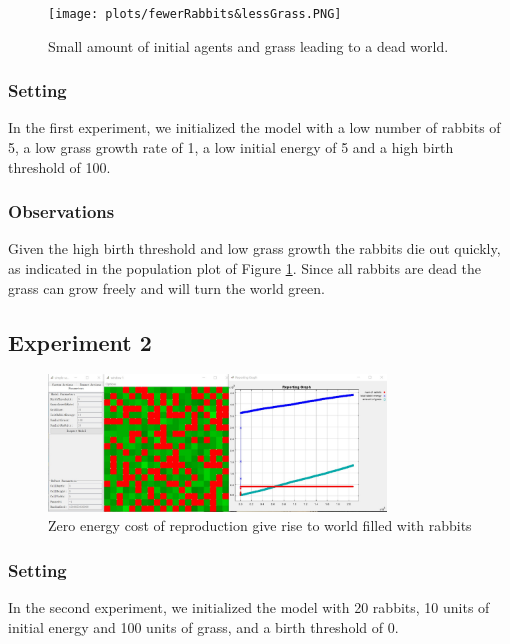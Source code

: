 \documentclass[11pt]{article}
\begin{document}
\begin{figure}[H]
 \begin{center}
  \texttt{[image: plots/fewerRabbits\&lessGrass.PNG]}
  \caption{Small amount of initial agents and grass leading to a dead world.}
  \label{fig:experiment1}
 \end{center}
\end{figure}


\subsubsection{Setting}
In the first experiment, we initialized the model with a low number of rabbits of 5, a low grass growth rate of 1, a low initial energy of 5 and a high birth threshold of 100.

\subsubsection{Observations}
Given the high birth threshold and low grass growth the rabbits die out quickly, as indicated in the population plot of Figure \ref{fig:experiment1}. Since all rabbits are dead the grass can grow freely and will turn the world green.

\subsection{Experiment 2}

\begin{figure}[H]
 \begin{center}
  \includegraphics[width=0.8\textwidth]{plots/noBirthThreshould.jpeg}
  \caption{Zero energy cost of reproduction give rise to world filled with rabbits}
  \label{fig:experiment2}
 \end{center}
\end{figure}

\subsubsection{Setting}
In the second experiment, we initialized the model with 20 rabbits, 10 units of initial energy and 100 units of grass, and a birth threshold of 0.
\end{document}
